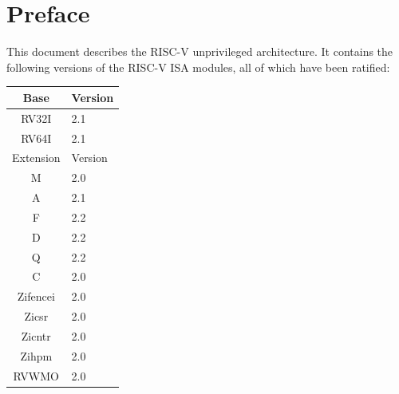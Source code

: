 \chapter{Preface}

This document describes the RISC-V unprivileged architecture.
It contains the following versions of the RISC-V ISA modules,
all of which have been ratified:

\bigskip

\begin{table}[hbt]
  \centering
  \begin{tabular}{|c|l|}
    \hline
    Base     & Version \\
    \hline
    RV32I    & 2.1 \\
    RV64I    & 2.1 \\
    \hline
    Extension & Version \\
    \hline
    M        & 2.0 \\
    A        & 2.1 \\
    F        & 2.2 \\
    D        & 2.2 \\
    Q        & 2.2 \\
    C        & 2.0 \\
    Zifencei & 2.0 \\
    Zicsr    & 2.0 \\
    Zicntr   & 2.0 \\
    Zihpm    & 2.0 \\
    RVWMO    & 2.0 \\
    \hline
  \end{tabular}
\end{table}
